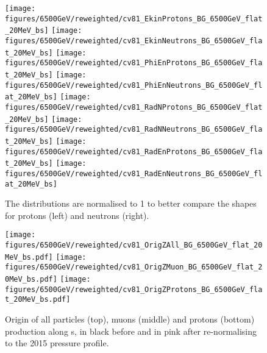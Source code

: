 \begin{figure}
\begin{center}
  \texttt{[image: figures/6500GeV/reweighted/cv81\_EkinProtons\_BG\_6500GeV\_flat\_20MeV\_bs]}
  \texttt{[image: figures/6500GeV/reweighted/cv81\_EkinNeutrons\_BG\_6500GeV\_flat\_20MeV\_bs]}
  \texttt{[image: figures/6500GeV/reweighted/cv81\_PhiEnProtons\_BG\_6500GeV\_flat\_20MeV\_bs]}
  \texttt{[image: figures/6500GeV/reweighted/cv81\_PhiEnNeutrons\_BG\_6500GeV\_flat\_20MeV\_bs]}
  \texttt{[image: figures/6500GeV/reweighted/cv81\_RadNProtons\_BG\_6500GeV\_flat\_20MeV\_bs]}
  \texttt{[image: figures/6500GeV/reweighted/cv81\_RadNNeutrons\_BG\_6500GeV\_flat\_20MeV\_bs]}
  \texttt{[image: figures/6500GeV/reweighted/cv81\_RadEnProtons\_BG\_6500GeV\_flat\_20MeV\_bs]}
  \texttt{[image: figures/6500GeV/reweighted/cv81\_RadEnNeutrons\_BG\_6500GeV\_flat\_20MeV\_bs]}
\end{center}
\vspace{-0.6cm}
 \caption{The distributions are normalised to 1 to better compare the shapes for protons (left) and neutrons (right).
  \label{fig:ProtNeut6p5}} 
\end{figure}

\begin{figure}
\begin{center}
  \texttt{[image: figures/6500GeV/reweighted/cv81\_OrigZAll\_BG\_6500GeV\_flat\_20MeV\_bs.pdf]}
  \texttt{[image: figures/6500GeV/reweighted/cv81\_OrigZMuon\_BG\_6500GeV\_flat\_20MeV\_bs.pdf]}
  \texttt{[image: figures/6500GeV/reweighted/cv81\_OrigZProtons\_BG\_6500GeV\_flat\_20MeV\_bs.pdf]}
\end{center}
\vspace{-0.6cm}
 \caption{Origin of all particles (top), muons (middle) and protons (bottom) production along s, in black before and in pink after re-normalising to the 2015 pressure profile. 
  \label{fig:OrigZ6p5}}
\end{figure}

